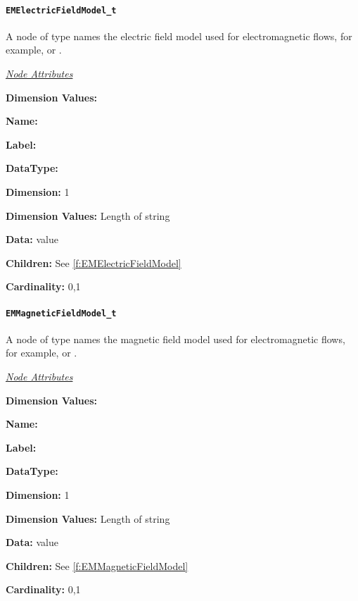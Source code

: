 \paragraph{\texttt{EMElectricFieldModel\_t}}

A node of type  names the electric
field model used for electromagnetic flows, for example,
 or .

\textit{\uline{Node Attributes}}
\begin{Ventryic}{\textbf{Dimension Values:}}
\item [\textbf{Name:}]
\item [\textbf{Label:}]
\item [\textbf{DataType:}]
\item [\textbf{Dimension:}]
      1
\item [\textbf{Dimension Values:}]
      Length of string
\item [\textbf{Data:}]
       value
\item [\textbf{Children:}]
      See \autoref{f:EMElectricFieldModel}
\item [\textbf{Cardinality:}]
      0,1
\end{Ventryic}

\paragraph{\texttt{EMMagneticFieldModel\_t}}

A node of type  names the magnetic
field model used for electromagnetic flows, for example,
 or .

\textit{\uline{Node Attributes}}
\begin{Ventryic}{\textbf{Dimension Values:}}
\item [\textbf{Name:}]
\item [\textbf{Label:}]
\item [\textbf{DataType:}]
\item [\textbf{Dimension:}]
      1
\item [\textbf{Dimension Values:}]
      Length of string
\item [\textbf{Data:}]
       value
\item [\textbf{Children:}]
      See \autoref{f:EMMagneticFieldModel}
\item [\textbf{Cardinality:}]
      0,1
\end{Ventryic}

